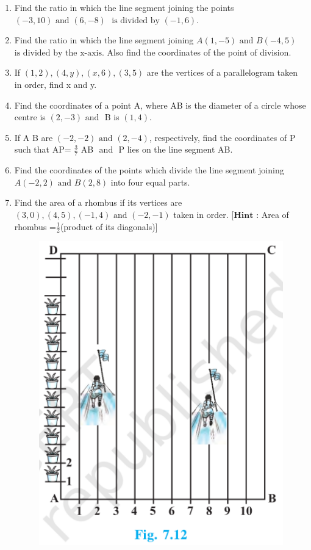 \documentclass[12pt]{article}
\let\vec\mathbf
\begin{document}
\begin{enumerate}
\item Find the ratio in which the line segment joining the points $(-3,10) \text{ and } (6,-8)$ $\text{ is divided by } (-1,6)$.
\item Find the ratio in which the line segment joining $A(1,-5) \text{ and } B(-4,5)$ $\text{is divided by the x-axis}$. Also find the coordinates of the point of division.
\item If $(1,2), (4,y), (x,6), (3,5)$ are the vertices of a parallelogram taken in order, find x and y.
\item Find the coordinates of a point A, where AB is the diameter of a circle whose centre is $(2,-3) \text{ and }$ B is $(1,4)$.
\item If A  B are $(-2,-2) \text{ and } (2,-4)$, respectively, find the coordinates of P such that AP= $\displaystyle \frac 37$ AB $\text{ and }$ P lies on the line segment AB.
\item Find the coordinates of the points which divide the line segment joining $A(-2,2) \text{ and } B(2,8)$ into four equal parts.
\item Find the area of a rhombus if its vertices are $(3,0), (4,5), (-1,4) \text{ and } (-2,-1)$ taken in order. [$\vec{Hint}$ : Area of rhombus =$\displaystyle \frac 12$(product of its diagonals)]
\begin{figure}[h!]
  \centering
  \includegraphics[width=0.5\columnwidth]{sc}
  \caption{}
\label{fig:10/7/12Fig1}
\end{figure}
\end{enumerate}
\end{document}
